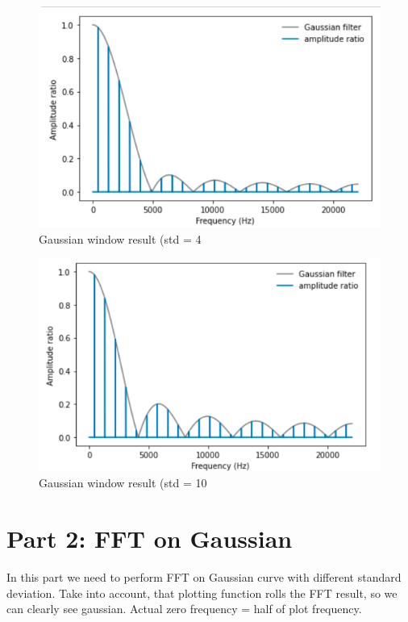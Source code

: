 \documentclass[a4paper]{article}
\begin{document}
        \begin{figure}[H]
            \centering
            \includegraphics[width=\textwidth]{img/p1_3.png}
            \caption{Gaussian window result (std = 4}
            \label{fig:p1_1}
        \end{figure}
        
        \begin{figure}[H]
            \centering
            \includegraphics[width=\textwidth]{img/p1_4.png}
            \caption{Gaussian window result (std = 10}
            \label{fig:p1_1}
        \end{figure}
        
    \newpage
        \section{Part 2: FFT on Gaussian}

        In this part we need to perform FFT on Gaussian curve with different standard deviation. Take into account, that plotting function rolls the FFT result, so we can clearly see gaussian. Actual zero frequency = half of plot frequency.
        
\end{document}
